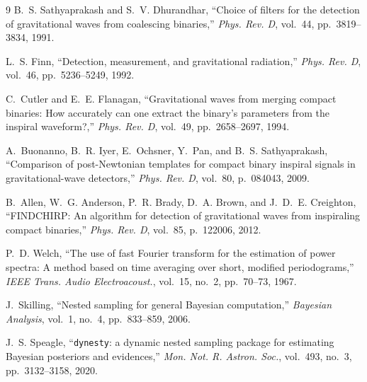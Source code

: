 \documentclass[11pt,a4paper]{report}
\begin{document}
\begin{thebibliography}{9}
B.~S. Sathyaprakash and S.~V. Dhurandhar, ``Choice of filters for the detection of gravitational waves from coalescing binaries,'' \emph{Phys. Rev. D}, vol.~44, pp.~3819--3834, 1991.

L.~S. Finn, ``Detection, measurement, and gravitational radiation,'' \emph{Phys. Rev. D}, vol.~46, pp.~5236--5249, 1992.

C.~Cutler and E.~E. Flanagan, ``Gravitational waves from merging compact binaries: How accurately can one extract the binary's parameters from the inspiral waveform?,'' \emph{Phys. Rev. D}, vol.~49, pp.~2658--2697, 1994.

A.~Buonanno, B.~R. Iyer, E.~Ochsner, Y.~Pan, and B.~S. Sathyaprakash, ``Comparison of post-Newtonian templates for compact binary inspiral signals in gravitational-wave detectors,'' \emph{Phys. Rev. D}, vol.~80, p.~084043, 2009.

B.~Allen, W.~G. Anderson, P.~R. Brady, D.~A. Brown, and J.~D.~E. Creighton, ``FINDCHIRP: An algorithm for detection of gravitational waves from inspiraling compact binaries,'' \emph{Phys. Rev. D}, vol.~85, p.~122006, 2012.

P.~D. Welch, ``The use of fast Fourier transform for the estimation of power spectra: A method based on time averaging over short, modified periodograms,'' \emph{IEEE Trans. Audio Electroacoust.}, vol.~15, no.~2, pp.~70--73, 1967.

J.~Skilling, ``Nested sampling for general Bayesian computation,'' \emph{Bayesian Analysis}, vol.~1, no.~4, pp.~833--859, 2006.

J.~S. Speagle, ``\texttt{dynesty}: a dynamic nested sampling package for estimating Bayesian posteriors and evidences,'' \emph{Mon. Not. R. Astron. Soc.}, vol.~493, no.~3, pp.~3132--3158, 2020.
\end{thebibliography}
\end{document}
